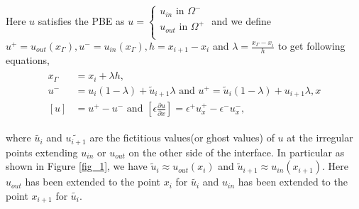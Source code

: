 Here $u$ satisfies the PBE as $u=\begin{cases}
u_{in} \text{ in }\Omega^-\\
u_{out}\text{ in }\Omega^+\\
\end{cases}$ and we define $u^+ = u_{out}(x_\Gamma),u^- = u_{in}(x_\Gamma),h=x_{i+1}-x_i$ and  $\lambda =\frac{x_\Gamma-x_i}{h}$ to get following equations,
\begin{eqnarray}
\begin{aligned}
x_\Gamma &= x_i + \lambda h,  \\
u^- &= u_i(1-\lambda )+ \tilde{u}_{i+1} \lambda \text{ and }u^+ = \tilde{u}_i(1-\lambda )+ u_{i+1}\lambda,x\\
\left[u\right]  & = u^+-u^- \text{ and }\left[ \epsilon \frac{\partial u}{\partial x} \right] =  \epsilon^+ u^+_x-\epsilon^- u^-_x,
\end{aligned}\label{1d_GFM}
\end{eqnarray}
	
where $\tilde{u_i}$ and $\tilde{u_{i+1}}$ are the fictitious values(or ghost values) of $u$ at the irregular points extending $u_{in}$ or $u_{out}$ on the other side of the interface. In particular as shown in Figure \ref{fig_1},  we have $\tilde{u}_i \approx u_{out}(x_i)$ and $\tilde{u}_{i+1}\approx u_{in}(x_{i+1})$. Here $u_{out}$ has been extended to the point $x_i$ for $\tilde{u_i}$ and $u_{in}$ has been extended to the point $x_{i+1}$ for $\tilde{u_i}$. 

